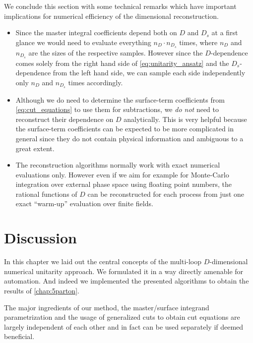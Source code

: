 We conclude this section with some technical remarks which
have important implications for numerical efficiency of the dimensional reconstruction.
\begin{itemize}
  \item Since the master integral coefficients depend both on $D$ and  $D_s$ at a first glance we would
    need to evaluate everything $n_D \cdot n_{D_s}$ times, where $n_D$ and $n_{D_s}$ are the sizes of the respective samples.
    However since the $D$-dependence comes solely from the right hand side of \cref{eq:unitarity_ansatz}
   and the $D_s$-dependence from the left hand side, we can sample each side independently only $n_D$ and $n_{D_s}$ times
   accordingly.
 \item Although we do need to determine the surface-term coefficients from \cref{eq:cut_equations} to use them for subtractions,
   we \textit{do not} need to reconstruct their dependence on $D$ analytically. 
   This is very helpful because the surface-term coefficients can be expected to be more complicated in general
   since they do not contain physical information and ambiguous to a great extent.
 \item The reconstruction algorithms normally work with exact numerical evaluations only.
   However even if we aim for example for Monte-Carlo integration over external phase space using floating point numbers,
   the rational functions of $D$ can be reconstructed for each process from just one exact ``warm-up'' evaluation over finite fields.
\end{itemize}

\section{Discussion}

In this chapter we laid out the central concepts of the multi-loop $D$-dimensional numerical unitarity approach.
We formulated it in a way directly amenable for automation.
And indeed we implemented the presented algorithms to obtain the results of \cref{chap:5parton}.

The major ingredients of our method, 
the master/surface integrand parametrization and
the usage of generalized cuts to obtain cut equations
are largely independent of each other and in fact 
can be used separately if deemed beneficial.

